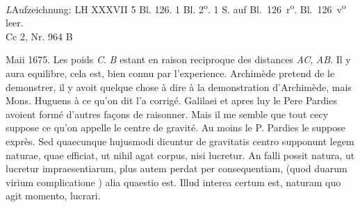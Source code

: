                    
              \begin{Ueberlieferung}%
{\textit{L}}Aufzeichnung: LH XXXVII 5 Bl. 126. 1 Bl. 2\textsuperscript{o}. 1 S. auf Bl.~126~r\textsuperscript{o}. Bl.~126~v\textsuperscript{o}
 leer.\\Cc 2, Nr. 964 B 
\end{Ueberlieferung}


\pstartfirst 
            [126~r\textsuperscript{o}] Maii 1675.  
            \pend 
            \count{}
            \count{}
\pstart 
 \noindent Les poids \textit{C}. \textit{B} estant en raison reciproque des distances   \textit{AC}, \textit{AB}. Il y aura equilibre, cela est,   bien connu par l'experience. Archim\`{e}de\protect{} pretend de le demonstrer, il y avoit quelque chose \`{a} dire \`{a} la demonstration d'Archim\`{e}de\protect{}, mais Mons. Huguens\protect{}  \`{a} ce qu'on dit l'a corrig\'{e}. Galilaei\protect{} et apres luy le Pere Pardies\protect{} avoient form\'{e} d'autres fa\c{c}ons   de raisonner. Mais il me semble que tout cecy suppose ce qu'on appelle le centre de gravit\'{e}.   Au moins le P. Pardies\protect{} le suppose expr\`{e}s.  Sed quaecunque hujusmodi dicuntur de gravitatis centro supponunt legem naturae, quae efficiat, ut nihil agat  corpus, nisi lucretur. An falli possit natura, ut lucretur impraesentiarum,   plus autem perdat per consequentiam, (quod duarum virium complicatione ) alia quaestio est. Illud interea certum est, naturam   quo agit momento, lucrari.  \pend
 \vspace{1em}
